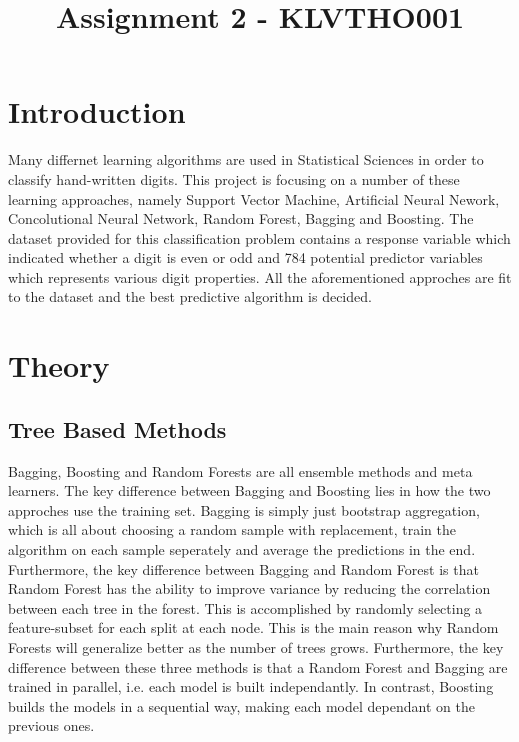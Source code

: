 \documentclass[a4paper,10pt]{article}
\begin{document}
\setlength\parindent{0pt}


\title{Assignment 2 - KLVTHO001}
\clearpage\maketitle
\thispagestyle{empty}


\newpage
\clearpage
\setcounter{page}{1}

\section{Introduction}
Many differnet learning algorithms are used in Statistical Sciences in order
to classify hand-written digits. This project is focusing on a number of these
learning approaches, namely Support Vector Machine, Artificial Neural Nework,
Concolutional Neural Network, Random Forest, Bagging and Boosting. The dataset provided for this classification problem contains
a response variable which indicated whether a digit is even or odd
and 784 potential predictor variables which represents various digit properties.
All the aforementioned approches are fit to the dataset and the best
predictive algorithm is decided.

\section{Theory}
\subsection{Tree Based Methods}
Bagging, Boosting and Random Forests are all ensemble methods and meta learners. The key
difference between Bagging and Boosting lies in how the two approches use the training set. Bagging
is simply just bootstrap aggregation, which is all about choosing a random sample with replacement,
train the algorithm on each sample seperately and average the predictions in the end. Furthermore,
the key difference between Bagging and Random Forest is that Random Forest has the ability to
improve variance by reducing the correlation between each tree in the forest. This is accomplished
by randomly selecting a feature-subset for each split at each node. This is the main reason why
Random Forests will generalize better as the number of trees grows. Furthermore,
the key difference between these three methods is that a Random Forest and Bagging are trained
in parallel, i.e. each model is built independantly. In contrast,
Boosting builds the models in a sequential way, making each model dependant on
the previous ones. \\
\end{document}
